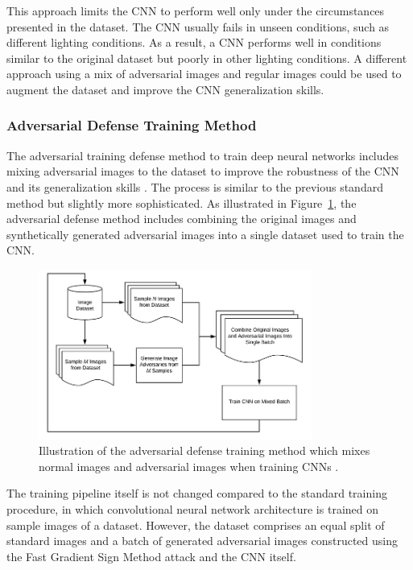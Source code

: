 \documentclass[12pt]{article}
\begin{document}
This approach limits the CNN to perform well only under the circumstances presented in the dataset. The CNN usually fails in unseen conditions, such as different lighting conditions. As a result, a CNN performs well in conditions similar to the original dataset but poorly in other lighting conditions. A different approach using a mix of adversarial images and regular images could be used to augment the dataset and improve the CNN generalization skills.

\subsubsection{Adversarial Defense Training Method}

The adversarial training defense method to train deep neural networks includes mixing adversarial images to the dataset to improve the robustness of the CNN and its generalization skills \parencite{Rosebrock}. The process is similar to the previous standard method but slightly more sophisticated. As illustrated in Figure~\ref{fig:advdefensemethod}, the adversarial defense method includes combining the original images and synthetically generated adversarial images into a single dataset used to train the CNN.

\begin{figure} [H] %
\begin{center}
\includegraphics[width=0.8\textwidth]{figures/advtraining.png}
\caption{Illustration of the adversarial defense training method which mixes normal images and adversarial images when training CNNs \parencite{Rosebrock}.}
\label{fig:advdefensemethod}
\end{center}
\end{figure}

The training pipeline itself is not changed compared to the standard training procedure, in which convolutional neural network architecture is trained on sample images of a dataset. However, the dataset comprises an equal split of standard images and a batch of generated adversarial images constructed using the Fast Gradient Sign Method attack and the CNN itself. 
\end{document}
